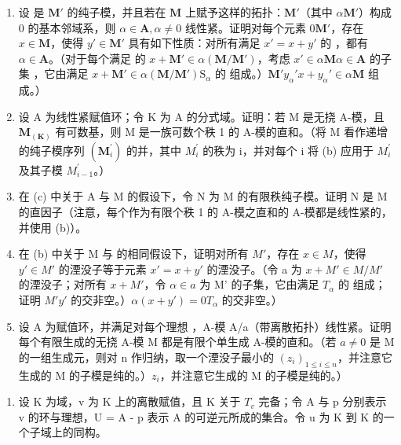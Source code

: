 \begin{enumerate}
\def\labelenumi{(\alph{enumi})}
\setcounter{enumi}{1}
\item
  设  是 \(\mathbf{M}'\) 的纯子模，并且若在 \(\mathbf{M}\) 上赋予这样的拓扑：\(\mathbf{M}'\)（其中 \(\alpha\mathbf{M}'\)）构成 0 的基本邻域系，则 \(\alpha \in \mathbf{A}, \alpha \neq 0\) 线性紧。证明对每个元素 \(0\)\(\mathbf{M}'\)，存在 \(x \in \mathbf{M}\)，使得 \(y' \in \mathbf{M}'\) 具有如下性质：对所有满足 \(x' = x + y'\) 的 ，都有 \(\alpha \in \mathbf{A}\)。（对于每个满足  的 \(x + \mathbf{M}' \in \alpha(\mathbf{M} / \mathbf{M}')\)，考虑 \(x' \in \alpha\mathbf{M}\)\(\alpha \in \mathbf{A}\) 的子集 ，它由满足 \(x + \mathbf{M}' \in \alpha(\mathbf{M} / \mathbf{M}')\)\(\mathrm{S}_{\alpha}\) 的  组成。）\(\mathbf{M}'\)\(y_{\alpha}'\)\(x + y_{\alpha}' \in \alpha\mathbf{M}\) 组成。）
\item
  设 A 为线性紧赋值环；令 K 为 A 的分式域。证明：若 M 是无挠 A-模，且 \(\mathbf{M}_{(\mathbf{K})}\) 有可数基，则 M 是一族可数个秩 1 的 A-模的直和。（将 M 看作递增的纯子模序列 \((\mathbf{M}_{i}^{\prime})\) 的并，其中 \(M_{i}^{\prime}\) 的秩为 i，并对每个 i 将 (b) 应用于 \(M_{i}^{\prime}\) 及其子模 \(M_{i-1}^{\prime}\)。）
\item
  在 (c) 中关于 A 与 M 的假设下，令 N 为 M 的有限秩纯子模。证明 N 是 M 的直因子（注意，每个作为有限个秩 1 的 A-模之直和的 A-模都是线性紧的，并使用 (b)）。
\item
  在 (b) 中关于 M 与  的相同假设下，证明对所有 \(M'\)，存在 \(x \in M\)，使得 \(y' \in M'\) 的湮没子等于元素 \(x' = x + y'\) 的湮没子。（令 a 为 \(x + M' \in M/M'\) 的湮没子；对所有 \(x + M'\)，令 \(\alpha \in a\) 为 M' 的子集，它由满足 \(T_{\alpha}\) 的  组成；证明 \(M'\)\(y'\) 的交非空。）\(\alpha(x + y') = 0\)\(T_{\alpha}\) 的交非空。）
\item
  设 A 为赋值环，并满足对每个理想 ，A-模 A/a（带离散拓扑）线性紧。证明每个有限生成的无挠 A-模 M 都是有限个单生成 A-模的直和。（若 \(a \neq 0\) 是 M 的一组生成元，则对 n 作归纳，取一个湮没子最小的 \((z_{i})_{1 \leqslant i \leqslant n}\)，并注意它生成的 M 的子模是纯的。）\(z_{i}\)，并注意它生成的 M 的子模是纯的。）
\end{enumerate}

\begin{enumerate}
\def\labelenumi{\arabic{enumi}.}
\setcounter{enumi}{6}
\tightlist
\item
  设 K 为域，v 为 K 上的离散赋值，且 K 关于 \(T_{v}\) 完备；令 A 与 p 分别表示 v 的环与理想，U = A - p 表示 A 的可逆元所成的集合。令 u 为 K 到 K 的一个子域上的同构。
\end{enumerate}


